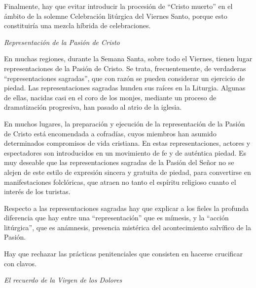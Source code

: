 			\begin{bodyintro}Finalmente, hay que evitar introducir la procesión de “Cristo muerto” en el ámbito de la solemne Celebración litúrgica del Viernes Santo, porque esto constituiría una mezcla híbrida de celebraciones.\end{bodyintro}
			
			\begin{bodyintro}\textit{Representación de la Pasión de Cristo}\end{bodyintro}
			
			\begin{bodyintro}En muchas regiones, durante la Semana Santa, sobre todo el Viernes, tienen lugar representaciones de la Pasión de Cristo. Se trata, frecuentemente, de verdaderas “representaciones sagradas”, que con razón se pueden considerar un ejercicio de piedad. Las representaciones sagradas hunden sus raíces en la Liturgia. Algunas de ellas, nacidas casi en el coro de los monjes, mediante un proceso de dramatización progresiva, han pasado al atrio de la iglesia.\end{bodyintro}
			
			\begin{bodyintro}En muchos lugares, la preparación y ejecución de la representación de la Pasión de Cristo está encomendada a cofradías, cuyos miembros han asumido determinados compromisos de vida cristiana. En estas representaciones, actores y espectadores son introducidos en un movimiento de fe y de auténtica piedad. Es muy deseable que las representaciones sagradas de la Pasión del Señor no se alejen de este estilo de expresión sincera y gratuita de piedad, para convertirse en manifestaciones folclóricas, que atraen no tanto el espíritu religioso cuanto el interés de los turistas.\end{bodyintro}
			
			\begin{bodyintro}Respecto a las representaciones sagradas hay que explicar a los fieles la profunda diferencia que hay entre una “representación” que es mímesis, y la “acción litúrgica”, que es anámnesis, presencia mistérica del acontecimiento salvífico de la Pasión.\end{bodyintro}
			
			\begin{bodyintro}Hay que rechazar las prácticas penitenciales que consisten en hacerse crucificar con clavos.\end{bodyintro}
			
			\begin{bodyintro}\textit{El recuerdo de la Virgen de los Dolores}\end{bodyintro}
			
